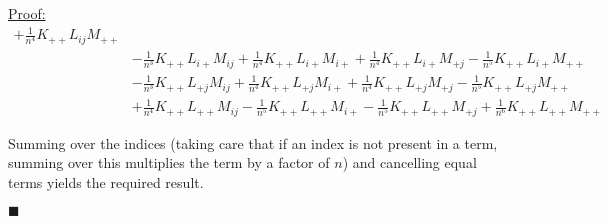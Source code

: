 \documentclass[12pt]{article}
\newenvironment{claimproof}[1]{\par\noindent\underline{Proof:}\space#1}{\hfill $\blacksquare$}
\numberwithin{claim}{section}
\numberwithin{lemma}{section}
\numberwithin{theorem}{section}
\begin{document}
\begin{claimproof}
\begin{align*}
+ \frac{1}{n^4}  K_{++}  L_{ij}  M_{++}
\\&
- \frac{1}{n^3}  K_{++}  L_{i+}  M_{ij}
+ \frac{1}{n^4}  K_{++}  L_{i+}  M_{i+}
+ \frac{1}{n^4}  K_{++}  L_{i+}  M_{+j}
- \frac{1}{n^5}  K_{++}  L_{i+}  M_{++}
\\&
- \frac{1}{n^3}  K_{++}  L_{+j}  M_{ij}
+ \frac{1}{n^4}  K_{++}  L_{+j}  M_{i+}
+ \frac{1}{n^4}  K_{++}  L_{+j}  M_{+j}
- \frac{1}{n^5}  K_{++}  L_{+j}  M_{++}
\\&
+ \frac{1}{n^4}  K_{++}  L_{++}  M_{ij}
- \frac{1}{n^5}  K_{++}  L_{++}  M_{i+}
- \frac{1}{n^5}  K_{++}  L_{++}  M_{+j}
+ \frac{1}{n^6}  K_{++}  L_{++}  M_{++}
\end{align*}

Summing over the indices (taking care that if an index is not present in a term, summing over this multiplies the term by a factor of $n$) and cancelling equal terms yields the required result.

\end{claimproof}
\end{document}
